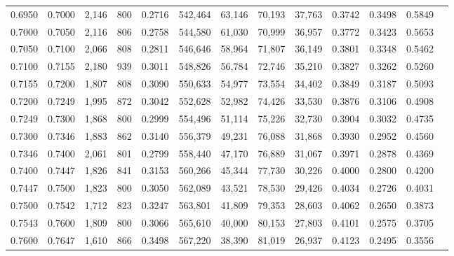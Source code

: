 \begin{tabular}{rrrrrrrrrrrrr}
0.6950 & 0.7000 &  2,146 &   800 &                                     0.2716 & 542,464 &  63,146 &  70,193 &  37,763 & 0.3742 & 0.3498 & 0.5849 \\
0.7000 & 0.7050 &  2,116 &   806 &                                     0.2758 & 544,580 &  61,030 &  70,999 &  36,957 & 0.3772 & 0.3423 & 0.5653 \\
0.7050 & 0.7100 &  2,066 &   808 &                                     0.2811 & 546,646 &  58,964 &  71,807 &  36,149 & 0.3801 & 0.3348 & 0.5462 \\
0.7100 & 0.7155 &  2,180 &   939 &                                     0.3011 & 548,826 &  56,784 &  72,746 &  35,210 & 0.3827 & 0.3262 & 0.5260 \\
0.7155 & 0.7200 &  1,807 &   808 &                                     0.3090 & 550,633 &  54,977 &  73,554 &  34,402 & 0.3849 & 0.3187 & 0.5093 \\
0.7200 & 0.7249 &  1,995 &   872 &                                     0.3042 & 552,628 &  52,982 &  74,426 &  33,530 & 0.3876 & 0.3106 & 0.4908 \\
0.7249 & 0.7300 &  1,868 &   800 &                                     0.2999 & 554,496 &  51,114 &  75,226 &  32,730 & 0.3904 & 0.3032 & 0.4735 \\
0.7300 & 0.7346 &  1,883 &   862 &                                     0.3140 & 556,379 &  49,231 &  76,088 &  31,868 & 0.3930 & 0.2952 & 0.4560 \\
0.7346 & 0.7400 &  2,061 &   801 &                                     0.2799 & 558,440 &  47,170 &  76,889 &  31,067 & 0.3971 & 0.2878 & 0.4369 \\
0.7400 & 0.7447 &  1,826 &   841 &                                     0.3153 & 560,266 &  45,344 &  77,730 &  30,226 & 0.4000 & 0.2800 & 0.4200 \\
0.7447 & 0.7500 &  1,823 &   800 &                                     0.3050 & 562,089 &  43,521 &  78,530 &  29,426 & 0.4034 & 0.2726 & 0.4031 \\
0.7500 & 0.7542 &  1,712 &   823 &                                     0.3247 & 563,801 &  41,809 &  79,353 &  28,603 & 0.4062 & 0.2650 & 0.3873 \\
0.7543 & 0.7600 &  1,809 &   800 &                                     0.3066 & 565,610 &  40,000 &  80,153 &  27,803 & 0.4101 & 0.2575 & 0.3705 \\
0.7600 & 0.7647 &  1,610 &   866 &                                     0.3498 & 567,220 &  38,390 &  81,019 &  26,937 & 0.4123 & 0.2495 & 0.3556 \\

\end{tabular}
